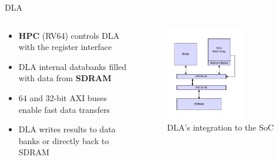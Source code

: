 \begin{frame}{DLA}
\begin{columns}
    \begin{column}{0.5\textwidth}
        \begin{itemize}
                \item \textbf{HPC} (RV64) controls DLA with the register interface
                \item DLA internal databanks filled with data from \textbf{SDRAM}
                \item 64 and 32-bit AXI buses enable fast data transfers
                \item DLA writes results to data banks or directly back to SDRAM
        \end{itemize}
      \end{column}
    \begin{column}{0.5\textwidth}
  \begin{figure}
    \includegraphics[width=0.7\textwidth]{../../thesis/img/dla-setup.drawio.pdf}
    \caption{DLA's integration to the SoC}
  \end{figure}
    \end{column}
\end{columns}
\end{frame}


